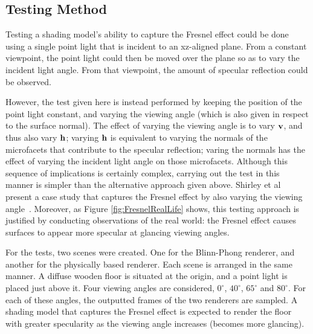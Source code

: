 \subsection{Testing Method}

Testing a shading model's ability to capture the Fresnel effect could be done using a single point light that is incident to an xz-aligned plane. From a constant viewpoint, the point light could then be moved over the plane so as to vary the incident light angle. From that viewpoint, the amount of specular reflection could be observed. 

However, the test given here is instead performed by keeping the position of the point light constant, and varying the viewing angle (which is also given in respect to the surface normal). The effect of varying the viewing angle is to vary \begin{math}\mathbf{v}\end{math}, and thus also vary \begin{math}\mathbf{h}\end{math}; varying \begin{math}\mathbf{h}\end{math} is equivalent to varying the normals of the microfacets that contribute to the specular reflection; varing the normals has the effect of varying the incident light angle on those microfacets. Although this sequence of implications is certainly complex, carrying out the test in this manner is simpler than the alternative approach given above. Shirley et al present a case study that captures the Fresnel effect by also varying the viewing angle~\cite{PractitionersReflectionModels}. Moreover, as Figure \ref{fig:FresnelRealLife} shows, this testing approach is justified by conducting observations of the real world: the Fresnel effect causes surfaces to appear more specular at glancing viewing angles.

For the tests, two scenes were created. One for the Blinn-Phong renderer, and another for the physically based renderer. Each scene is arranged in the same manner. A diffuse wooden floor is situated at the origin, and a point light is placed just above it. Four viewing angles are considered, \begin{math}0^{\circ}\end{math}, \begin{math}40^{\circ}\end{math}, \begin{math}65^{\circ}\end{math} and \begin{math}80^{\circ}\end{math}. For each of these angles, the outputted frames of the two renderers are sampled. A shading model that captures the Fresnel effect is expected to render the floor with greater specularity as the viewing angle increases (becomes more glancing).

